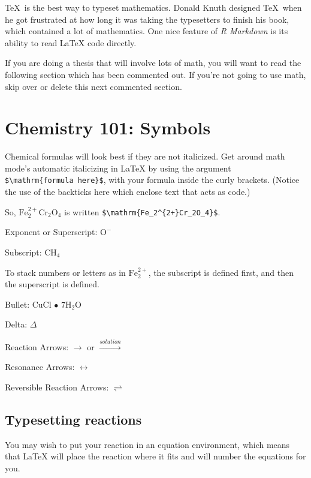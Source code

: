\documentclass[
  letterpaper,
  12pt,
  twoside]{book}
\begin{document}
\TeX~is the best way to typeset mathematics. Donald Knuth designed
\TeX~when he got frustrated at how long it was taking the typesetters to
finish his book, which contained a lot of mathematics. One nice feature
of \emph{R Markdown} is its ability to read LaTeX code directly.

If you are doing a thesis that will involve lots of math, you will want
to read the following section which has been commented out. If you're
not going to use math, skip over or delete this next commented section.

\section{Chemistry 101: Symbols}\label{chemistry-101-symbols}

Chemical formulas will look best if they are not italicized. Get around
math mode's automatic italicizing in LaTeX by using the argument
\texttt{\$\textbackslash{}mathrm\{formula\ here\}\$}, with your formula
inside the curly brackets. (Notice the use of the backticks here which
enclose text that acts as code.)

So, \(\mathrm{Fe_2^{2+}Cr_2O_4}\) is written
\texttt{\$\textbackslash{}mathrm\{Fe\_2\^{}\{2+\}Cr\_2O\_4\}\$}.

\noindent Exponent or Superscript: \(\mathrm{O^-}\)

\noindent Subscript: \(\mathrm{CH_4}\)

To stack numbers or letters as in \(\mathrm{Fe_2^{2+}}\), the subscript
is defined first, and then the superscript is defined.

\noindent Bullet: CuCl \(\bullet\) \(\mathrm{7H_{2}O}\)

\noindent Delta: \(\Delta\)

\noindent Reaction Arrows: \(\longrightarrow\) or
\(\xrightarrow{solution}\)

\noindent Resonance Arrows: \(\leftrightarrow\)

\noindent Reversible Reaction Arrows: \(\rightleftharpoons\)

\subsection{Typesetting reactions}\label{typesetting-reactions}

You may wish to put your reaction in an equation environment, which
means that LaTeX will place the reaction where it fits and will number
the equations for you.
\end{document}
